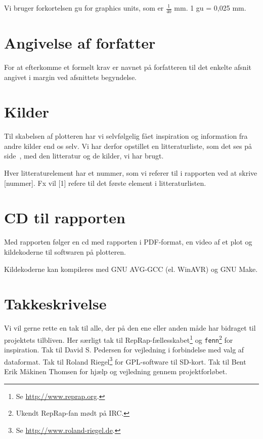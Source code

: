Vi bruger forkortelsen gu for graphics units, som er $\tfrac 1{40}$
mm. 1 gu = 0,025 mm.


\section{Angivelse af forfatter}

For at efterkomme et formelt krav er navnet på forfatteren til det
enkelte afsnit angivet i margin ved afsnittets begyndelse.


\section{Kilder}
Til skabelsen af plotteren har vi selvfølgelig fået inspiration og
information fra andre kilder end os selv. Vi har derfor opstillet en
litteraturliste, som det ses på side~\pageref{ch:litteratur}, med den
litteratur og de kilder, vi har brugt.

Hver litteraturelement har et nummer, som vi referer til i rapporten
ved at skrive [nummer]. Fx vil [1] refere til det første element i
litteraturlisten.


\section{CD til rapporten}

Med rapporten følger en cd med rapporten i PDF-format, en video af et
plot og kildekoderne til softwaren på plotteren.

Kildekoderne kan kompileres med GNU AVG-GCC (el. WinAVR) og GNU Make.


\section{Takkeskrivelse}


Vi vil gerne rette en tak til alle, der på den ene eller anden måde
har bidraget til projektets tilbliven. Her særligt tak til
RepRap-fællesskabet\footnote{Se \url{http://www.reprap.org}.} og
\texttt{fenn}\footnote{Ukendt RepRap-fan mødt på IRC.} for
inspiration. Tak til David S. Pedersen for vejledning i forbindelse
med valg af dataformat. Tak til Roland Riegel\footnote{Se
  \url{http://www.roland-riegel.de}.} for GPL-software til
SD-kort. Tak til Bent Erik Mäkinen Thomsen for hjælp og vejledning
gennem projektforløbet.


